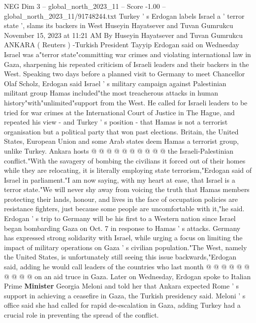 \begin{textsample}{NEG Dim 3 – global\_north\_2023\_11 – Score -1.00 – global\_north\_2023\_11/91748244.txt}  \label{ex:f3_neg_288}
Turkey ' s Erdogan labels Israel a ' terror state ', slams its backers in West Huseyin Hayatsever and Tuvan Gumrukcu November 15, 2023 at 11:21 AM By Huseyin Hayatsever and Tuvan Gumrukcu ANKARA ( Reuters ) -Turkish President Tayyip Erdogan said on Wednesday Israel was a"terror state"committing war crimes and violating international law in Gaza, sharpening his repeated criticism of Israeli leaders and their backers in the West.
Speaking two days before a planned visit to Germany to meet Chancellor Olaf Scholz, Erdogan said Israel ' s military campaign against Palestinian militant group Hamas included"the most treacherous attacks in human history"with"unlimited"support from the West.
He called for Israeli leaders to be tried for war crimes at the International Court of Justice in The Hague, and repeated his view - and Turkey ' s position - that Hamas is not a terrorist organisation but a political party that won past elections.
Britain, the United States, European Union and some Arab states deem Hamas a terrorist group, unlike Turkey.
Ankara hosts @ @ @ @ @ @ @ @ @ @ the Israeli-Palestinian conflict."With the savagery of bombing the civilians it forced out of their homes while they are relocating, it is literally employing state terrorism,"Erdogan said of Israel in parliament."I am now saying, with my heart at ease, that Israel is a terror state."We will never shy away from voicing the truth that Hamas members protecting their lands, honour, and lives in the face of occupation policies are resistance fighters, just because some people are uncomfortable with it,"he said.
Erdogan ' s trip to Germany will be his first to a Western nation since Israel began bombarding Gaza on Oct. 7 in response to Hamas ' s attacks.
Germany has expressed strong solidarity with Israel, while urging a focus on limiting the impact of military operations on Gaza ' s civilian population."The West, namely the United States, is unfortunately still seeing this issue backwards,"Erdogan said, adding he would call leaders of the countries who last month @ @ @ @ @ @ @ @ @ @ on an aid truce in Gaza.
Later on Wednesday, Erdogan spoke to Italian Prime \textbf{Minister} Georgia Meloni and told her that Ankara expected Rome ' s support in achieving a ceasefire in Gaza, the Turkish presidency said.
Meloni ' s office said she had called for rapid de-escalation in Gaza, adding Turkey had a crucial role in preventing the spread of the conflict.

\end{textsample}
